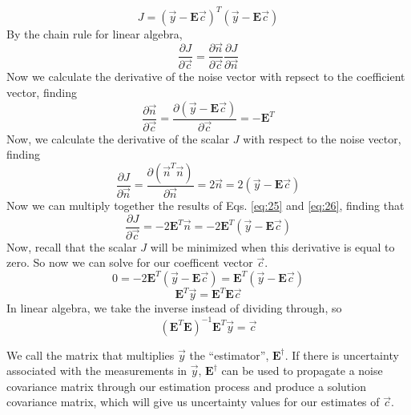 \documentclass{article}
\begin{document}
\begin{equation}
\label{eq:23}
J = (\vec{y} - \mathbf{E}\vec{c})^T(\vec{y} - \mathbf{E} \vec{c})
\end{equation}
By the chain rule for linear algebra, 
\begin{equation}
\label{eq:24}
\frac{\partial J}{\partial \vec{c}} = \frac{\partial \vec{n}}{\partial \vec{c}} \frac{\partial J}{\partial \vec{n}}
\end{equation}
Now we calculate the derivative of the noise vector with repsect to the coefficient vector, finding
\begin{equation}
\label{eq:25}
\frac{\partial\vec{n}}{\partial \vec{c}} = \frac{\partial (\vec{y} - \mathbf{E} \vec{c})}{\partial \vec{c}} = -\mathbf{E}^{T}
\end{equation}
Now, we calculate the derivative of the scalar $J$ with respect to the noise vector, finding
\begin{equation}
\label{eq:26}
\frac{\partial J}{\partial \vec{n}} = \frac{\partial (\vec{n}^T\vec{n})}{\partial \vec{n}} = 2 \vec{n} = 2(\vec{y}-\mathbf{E}\vec{c})
\end{equation}
Now we can multiply together the results of Eqs. \ref{eq:25} and \ref{eq:26}, finding that
\begin{equation}
\label{eq:27}
\frac{\partial J}{\partial \vec{c}} = -2 \mathbf{E}^T \vec{n} = -2 \mathbf{E}^T (\vec{y} - \mathbf{E}\vec{c})
\end{equation}
Now, recall that the scalar $J$ will be minimized when this derivative is equal to zero. So now we can solve for our coefficent vector $\vec{c}$.
\begin{equation}
\label{eq:28}
0 = -2 \mathbf{E}^T (\vec{y} - \mathbf{E}\vec{c}) = \mathbf{E}^T (\vec{y} - \mathbf{E}\vec{c})
\end{equation}
\begin{equation}
\label{eq:29}
\mathbf{E}^T \vec{y} =  \mathbf{E}^T \mathbf{E}\vec{c}
\end{equation}
In linear algebra, we take the inverse instead of dividing through, so
\begin{equation}
\label{eq:30}
( \mathbf{E}^T \mathbf{E} ) ^{-1} \mathbf{E}^T \vec{y} = \vec{c}
\end{equation}

We call the matrix that multiplies $\vec{y}$ the ``estimator'', $\mathbf{E}^{\dagger}$. If there is uncertainty associated with the measurements in $\vec{y}$, $\mathbf{E}^{\dagger}$ can be used to propagate a noise covariance matrix through our estimation process and produce a solution covariance matrix, which will give us uncertainty values for our estimates of $\vec{c}$.
\end{document}
